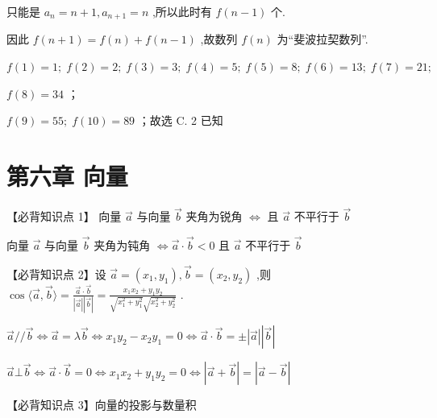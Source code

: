 \documentclass[10pt]{article}
\newcommand*\circled[1]{\tikz[baseline=(char.base)]{\node[shape=circle,draw,inner sep=1.5pt] (char) {\small #1};}}
\begin{document}
只能是 \({a}_{n} = n + 1,{a}_{n + 1} = n\) ,所以此时有 \(f\left( {n - 1}\right)\) 个.

因此 \(f\left( {n + 1}\right)  = f\left( n\right)  + f\left( {n - 1}\right)\) ,故数列 \(f\left( n\right)\) 为“斐波拉契数列”.

\(f\left( 1\right)  = 1;\;f\left( 2\right)  = 2;\;f\left( 3\right)  = 3;\;f\left( 4\right)  = 5;\;f\left( 5\right)  = 8;\;f\left( 6\right)  = {13};\;f\left( 7\right)  = {21};\)

\(f\left( 8\right)  = {34}\) ；

\(f\left( 9\right)  = {55};\;f\left( {10}\right)  = {89}\) ；故选 C. 2 已知

\section*{第六章 向量}

【必背知识点 1】 \circled{1}  向量 \(\overrightarrow{a}\) 与向量 \(\overrightarrow{b}\) 夹角为锐角 \(\Leftrightarrow\) 且 \(\overrightarrow{a}\) 不平行于 \(\overrightarrow{b}\)

 \circled{2}  向量 \(\overrightarrow{a}\) 与向量 \(\overrightarrow{b}\) 夹角为钝角 \(\Leftrightarrow  \overrightarrow{a} \cdot  \overrightarrow{b} < 0\) 且 \(\overrightarrow{a}\) 不平行于 \(\overrightarrow{b}\)

【必背知识点 2】设 \(\overrightarrow{a} = \left( {{x}_{1},{y}_{1}}\right) ,\overrightarrow{b} = \left( {{x}_{2},{y}_{2}}\right)\) ,则 \(\cos \langle \overrightarrow{a},\overrightarrow{b}\rangle  = \frac{\overrightarrow{a} \cdot  \overrightarrow{b}}{\left| \overrightarrow{a}\right| \left| \overrightarrow{b}\right| } = \frac{{x}_{1}{x}_{2} + {y}_{1}{y}_{2}}{\sqrt{{x}_{1}^{2} + {y}_{1}^{2}}\sqrt{{x}_{2}^{2} + {y}_{2}^{2}}}\) .

\(\overrightarrow{a}//\overrightarrow{b} \Leftrightarrow  \overrightarrow{a} = \lambda \overrightarrow{b} \Leftrightarrow  {x}_{1}{y}_{2} - {x}_{2}{y}_{1} = 0 \Leftrightarrow  \overrightarrow{a} \cdot  \overrightarrow{b} =  \pm  \left| \overrightarrow{a}\right| \left| \overrightarrow{b}\right|\)

\(\overrightarrow{a} \bot  \overrightarrow{b} \Leftrightarrow  \overrightarrow{a} \cdot  \overrightarrow{b} = 0 \Leftrightarrow  {x}_{1}{x}_{2} + {y}_{1}{y}_{2} = 0 \Leftrightarrow  \left| {\overrightarrow{a} + \overrightarrow{b}}\right|  = \left| {\overrightarrow{a} - \overrightarrow{b}}\right|\)

【必背知识点 3】向量的投影与数量积
\end{document}
